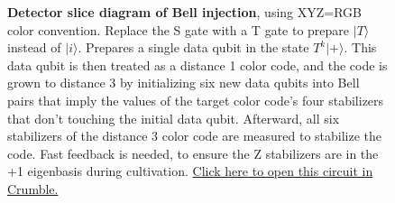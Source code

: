 \documentclass[onecolumn,unpublished,a4paper]{quantumarticle}
\theoremstyle{definition}
\begin{document}
\begin{figure}
    \centering
    \begin{adjustwidth}{-2.0cm}{-2.0cm}
        \centering
    \end{adjustwidth}
    \caption{
        \textbf{Detector slice diagram of Bell injection}, using XYZ=RGB color convention.
        Replace the S gate with a T gate to prepare $|T\rangle$ instead of $|i\rangle$.
        Prepares a single data qubit in the state $T^k|+\rangle$.
        This data qubit is then treated as a distance 1 color code, and the code is grown to distance 3 by initializing six new data qubits into Bell pairs that imply the values of the target color code's four stabilizers that don't touching the initial data qubit.
        Afterward, all six stabilizers of the distance 3 color code are measured to stabilize the code.
        Fast feedback is needed, to ensure the Z stabilizers are in the +1 eigenbasis during cultivation.
        \href{
            https://algassert.com/crumble\#circuit=Q(0,0)0;Q(1,0)1;Q(1,1)2;Q(1,2)3;Q(2,0)4;Q(2,1)5;Q(2,2)6;Q(2,3)7;Q(3,0)8;Q(3,1)9;Q(3,2)10;Q(4,0)11;POLYGON(0,0,1,0.25)8_11_10_5;POLYGON(0,1,0,0.25)7_10_5_2;POLYGON(1,0,0,0.25)0_8_5_2;POLYGON(1,0,1,0.25)2_7;POLYGON(1,0,1,0.25)5_10;POLYGON(1,0,1,0.25)11_8;TICK;R_6_2_7_5_10_11_4;RX_0_3_9_8_1;TICK;CX_1_4_3_6_8_11_9_5;TICK;S_DAG_0;TICK;CX_0_1_3_2_6_7_8_4_9_10;TICK;CX_2_1_5_4_7_6_10_9;TICK;CX_1_0_2_3_4_8;TICK;CX_1_2_4_5;TICK;CX_1_4;TICK;M_3_6_9_4;MX_1;DT(1,2,0)rec[-5];DT(2,2,0)rec[-4];DT(3,1,0)rec[-3];TICK;TICK;MPP_X0*X2*X5*X8;DT(1,0,1)rec[-1]_rec[-2];TICK;MPP_Z0*Z2*Z5*Z8;DT(2,0,2)rec[-1]_rec[-4];TICK;MPP_X2*X5*X7*X10;DT(1,1,3)rec[-1];TICK;MPP_Z2*Z5*Z7*Z10;DT(2,0,4)rec[-1]_rec[-6];TICK;MPP_X5*X8*X10*X11;DT(2,1,5)rec[-1];TICK;MPP_Z5*Z8*Z10*Z11;DT(2,1,6)rec[-1];TICK;MPP_Y0*Y2*Y5*Y7*Y8*Y10*Y11;OI(0)rec[-1]
        }{Click here to open this circuit in Crumble.}
    }
    \label{fig:d3-init-bell}
\end{figure}
\end{document}
